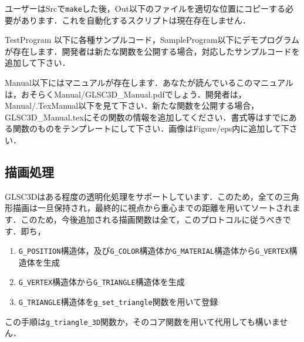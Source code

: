 \documentclass[a4paper,12pt]{jsarticle}%
\begin{document}
ユーザーはSrcで\verb|make|した後，Out以下のファイルを適切な位置にコピーする必要があります．これを自動化するスクリプトは現在存在しません．

TestProgram 以下に各種サンプルコード，SampleProgram以下にデモプログラムが存在します．開発者は新たな関数を公開する場合，対応したサンプルコードを追加して下さい．

Manual以下にはマニュアルが存在します．あなたが読んでいるこのマニュアルは，おそらくManual/GLSC3D\_Manual.pdfでしょう．開発者は，Manual/.TexManual以下を見て下さい．新たな関数を公開する場合，GLSC3D\_Manual.texにその関数の情報を追加してください．書式等はすでにある関数のものをテンプレートにして下さい．画像はFigure/eps内に追加して下さい．


\subsection{描画処理}
GLSC3Dはある程度の透明化処理をサポートしています．このため，全ての三角形描画は一旦保持され，最終的に視点から重心までの距離を用いてソートされます．このため，今後追加される描画関数は全て，このプロトコルに従うべきです．即ち，

\begin{enumerate}
 \item \verb|G_POSITION|構造体，及び\verb|G_COLOR|構造体か\verb|G_MATERIAL|構造体から\verb|G_VERTEX|構造体を生成
 \item \verb|G_VERTEX|構造体から\verb|G_TRIANGLE|構造体を生成
 \item \verb|G_TRIANGLE|構造体を\verb|g_set_triangle|関数を用いて登録
\end{enumerate}

この手順は\verb|g_triangle_3D|関数か，そのコア関数を用いて代用しても構いません．
\end{document}
